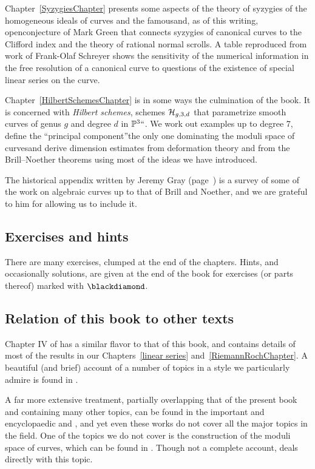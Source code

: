 Chapter~\ref{SyzygiesChapter} presents some aspects of the theory of syzygies of the homogeneous ideals of curves and the famous\emdash and, as of this writing, open\emdash conjecture of Mark Green that connects syzygies of canonical curves to the Clifford index and the theory of rational normal scrolls. A table reproduced from work of Frank-Olaf Schreyer shows the sensitivity of the numerical information in the free resolution of a canonical curve to questions of the existence of special linear series on the curve.

Chapter~\ref{HilbertSchemesChapter} is in some ways the culmination of
the book. It is concerned with \emph{Hilbert schemes}, schemes
$\cH_{g,3,d}$ that parametrize smooth curves of genus $g$ and degree
$d$  in $\PP^3` `$. We work out examples up to degree 7, define the
``principal component''\emdash the only one dominating the moduli
space of curves\emdash and derive dimension estimates from deformation
theory and from the Brill--Noether theorems
using most of the ideas we have introduced. 

The historical appendix written by Jeremy Gray
(page~\pageref{Appendix-History}) is a survey of some of the work on
algebraic curves up to that of Brill and Noether, and we are grateful to him for allowing us to include it.

\subsection*{Exercises and hints}

There are many exercises, clumped at the end of the chapters. Hints,
and occasionally solutions, are given at the end of the book
for exercises (or parts thereof) marked with $\blackdiamond$.

\subsection*{Relation of this book to other texts} 
Chapter IV of \cite{Hartshorne1977} has a similar flavor to that of this book, and contains details of most of the 
results in our Chapters~\ref{linear series} and~\ref{RiemannRochChapter}. A beautiful (and brief) account of a number of topics in a style we particularly admire is found in \cite{MumfordCJ}.

A far more extensive treatment, partially overlapping that of the present book and containing many other topics, can be found in the important and encyclopaedic \cite{ACGH} and \cite{ACG}, and yet even these works do not cover all the major topics in the field. 
One of the topics we do not cover is the construction of the moduli space of curves, which can be found
in \cite{ACG}. Though not a complete account, \cite{MR1631825} deals directly with this
topic. 

